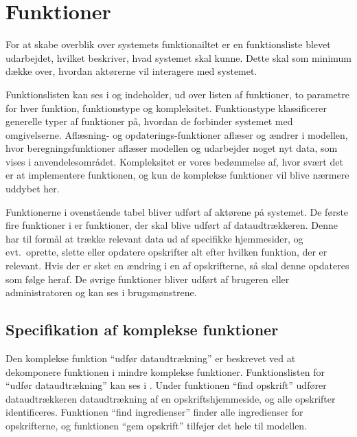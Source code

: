 \section{Funktioner}
\label{sec:funktioner}

For at skabe overblik over systemets funktionailtet er en funktionsliste  blevet udarbejdet, hvilket beskriver, hvad systemet skal kunne. Dette skal som minimum dække over, hvordan aktørerne vil interagere med systemet.

Funktionslisten kan ses i  og indeholder, ud over listen af funktioner, to parametre for hver funktion, funktionstype og kompleksitet. Funktionstype klassificerer generelle typer af funktioner på, hvordan de forbinder systemet med omgivelserne. Aflæsning- og opdaterings-funktioner aflæser og ændrer i modellen, hvor beregningsfunktioner aflæser modellen og udarbejder noget nyt data, som vises i anvendelesområdet. Kompleksitet er vores bedømmelse af, hvor svært det er at implementere funktionen, og kun de komplekse funktioner vil blive nærmere uddybet her.



Funktionerne i ovenstående tabel bliver udført af aktørene på systemet. De første fire funktioner i  er funktioner, der skal blive udført af dataudtrækkeren. Denne har til formål at trække relevant data ud af specifikke hjemmesider, og evt.\ oprette, slette eller opdatere opskrifter alt efter hvilken funktion, der er relevant. Hvis der \fx er sket en ændring i en af opskrifterne, så skal denne opdateres som følge heraf. De øvrige funktioner bliver udført af brugeren eller administratoren og kan ses i brugsmønstrene.

\subsection{Specifikation af komplekse funktioner}
Den komplekse funktion ``udfør dataudtrækning'' er beskrevet ved at dekomponere funktionen i mindre komplekse funktioner. Funktionslisten for ``udfør dataudtrækning'' kan ses i . Under funktionen ``find opskrift'' udfører dataudtrækkeren dataudtrækning af en opskriftshjemmeside, og alle opskrifter identificeres. Funktionen ``find ingredienser'' finder alle ingredienser for opskrifterne, og funktionen ``gem opskrift'' tilføjer det hele til modellen.


